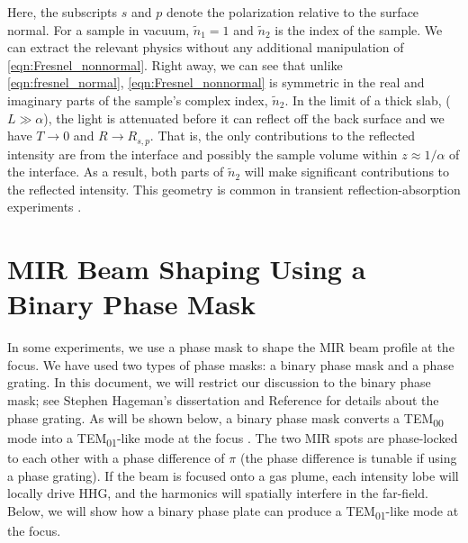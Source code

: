Here, the subscripts $s$ and $p$ denote the polarization relative to the surface normal. For a sample in vacuum, $\tilde{n}_1=1$ and $\tilde{n}_2$ is the index of the sample. We can extract the relevant physics without any additional manipulation of \cref{eqn:Fresnel_nonnormal}. Right away, we can see that unlike \cref{eqn:fresnel_normal}, \cref{eqn:Fresnel_nonnormal} is symmetric in the real and imaginary parts of the sample's complex index, $\tilde{n}_2$. In the limit of a thick slab, ($L \gg \alpha$), the light is attenuated before it can reflect off the back surface and we have $T \rightarrow 0$ and $R \rightarrow R_{s,p}$. That is, the only contributions to the reflected intensity are from the interface and possibly the sample volume within $z \approx 1/\alpha$ of the interface. As a result, both parts of $\tilde{n}_2$ will make significant contributions to the reflected intensity. This geometry is common in transient reflection-absorption experiments \cite{cirriAchievingSurfaceSensitivity2017,kaplanFemtosecondTrackingCarrier2018}.

\section{MIR Beam Shaping Using a Binary Phase Mask}
\label{sec:pi-plate-math}

In some experiments, we use a phase mask to shape the MIR beam profile at the focus. We have used two types of phase masks: a binary phase mask and a phase grating. In this document, we will restrict our discussion to the binary phase mask; see Stephen Hageman's dissertation \cite{hagemanComplexAttosecondTransient2020} and Reference \cite{camperHighRelativephasePrecision2019} for details about the phase grating. As will be shown below, a binary phase mask converts a TEM\textsubscript{00} mode into a TEM\textsubscript{01}-like mode at the focus \cite{hagemanComplexAttosecondTransient2020,camperHighRelativephasePrecision2019,camperTransverseElectromagneticMode2015,camperHighharmonicPhaseSpectroscopy2014,camperCombinedHighharmonicInterferometries2015}. The two MIR spots are phase-locked to each other with a phase difference of $\pi$ (the phase difference is tunable if using a phase grating). If the beam is focused onto a gas plume, each intensity lobe will locally drive HHG, and the harmonics will spatially interfere in the far-field. Below, we will show how a binary phase plate can produce a TEM\textsubscript{01}-like mode at the focus.

